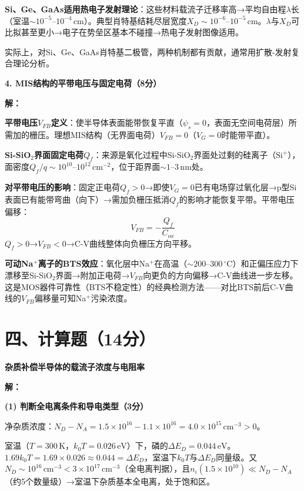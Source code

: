 \documentclass[12pt,a4paper]{ctexart}
\begin{document}
\textbf{Si、Ge、GaAs适用热电子发射理论}：这些材料载流子迁移率高→平均自由程$\lambda$长（室温$\sim10^{-5}$--$10^{-4}\,\text{cm}$）。典型肖特基结耗尽层宽度$X_D \sim 10^{-6}$--$10^{-5}\,\text{cm}$。$\lambda$与$X_D$可比拟甚至更小→电子在势垒区基本不碰撞→热电子发射图像适用。

实际上，对Si、Ge、GaAs肖特基二极管，两种机制都有贡献，通常用扩散-发射复合理论分析。

\vspace{0.5cm}

\noindent\textbf{4. MIS结构的平带电压与固定电荷（8分）}

\textbf{解：}\quad

\textbf{平带电压$V_{FB}$定义}：使半导体表面能带恢复平直（$\psi_s = 0$，表面无空间电荷层）所需加的栅压。理想MIS结构（无界面电荷）$V_{FB} = 0$（$V_G = 0$时能带平直）。

\textbf{Si-SiO$_2$界面固定电荷$Q_f$}：来源是氧化过程中Si-SiO$_2$界面处过剩的硅离子（Si$^+$），面密度$Q_f/q \sim 10^{10}$--$10^{12}\,\text{cm}^{-2}$，位于距界面$\sim 1$--$3\,\text{nm}$处。

\textbf{对平带电压的影响}：固定正电荷$Q_f > 0$→即使$V_G = 0$已有电场穿过氧化层→p型Si表面已有能带弯曲（向下）→需加负栅压抵消$Q_f$的影响才能恢复平带。平带电压偏移：
\[
V_{FB} = -\frac{Q_f}{C_{ox}}
\]
$Q_f > 0$→$V_{FB} < 0$→C-V曲线整体向负栅压方向平移。

\textbf{可动Na$^+$离子的BTS效应}：氧化层中Na$^+$在高温（$\sim 200$--$300\,^\circ$C）和正偏压应力下漂移至Si-SiO$_2$界面→附加正电荷→$V_{FB}$向更负的方向偏移→C-V曲线进一步左移。这是MOS器件可靠性（BTS不稳定性）的经典检测方法——对比BTS前后C-V曲线的$V_{FB}$偏移量可知Na$^+$污染浓度。

\newpage

\section*{四、计算题（14分）}

\noindent\textbf{杂质补偿半导体的载流子浓度与电阻率}

\vspace{4pt}

\textbf{解：}

\noindent\textbf{(1) 判断全电离条件和导电类型（3分）}

净杂质浓度：$N_D - N_A = 1.5\times10^{16} - 1.1\times10^{16} = 4.0\times10^{15}\,\text{cm}^{-3} > 0$。

室温（$T = 300\,\text{K}$，$k_0T = 0.026\,\text{eV}$）下，磷的$\Delta E_D = 0.044\,\text{eV}$。$1.69k_0T = 1.69 \times 0.026 \approx 0.044 = \Delta E_D$，室温下$k_0T$与$\Delta E_D$同量级。又$N_D \sim 10^{16}\,\text{cm}^{-3} < 3\times10^{17}\,\text{cm}^{-3}$（全电离判据），且$n_i(1.5\times10^{10}) \ll N_D - N_A$（约5个数量级）→室温下杂质基本全电离，处于饱和区。
\end{document}
